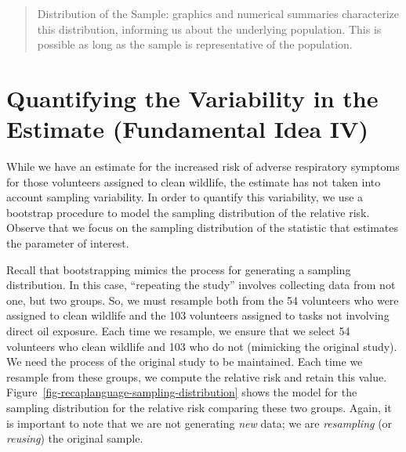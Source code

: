 \documentclass[
  letterpaper,
  DIV=11,
  numbers=noendperiod]{scrreprt}
\theoremstyle{plain}
\theoremstyle{definition}
\theoremstyle{definition}
\theoremstyle{remark}
\begin{document}
\begin{quote}
Distribution of the Sample: graphics and numerical summaries
characterize this distribution, informing us about the underlying
population. This is possible as long as the sample is representative of
the population.
\end{quote}

\hypertarget{quantifying-the-variability-in-the-estimate-fundamental-idea-iv}{%
\section{Quantifying the Variability in the Estimate (Fundamental Idea
IV)}\label{quantifying-the-variability-in-the-estimate-fundamental-idea-iv}}

While we have an estimate for the increased risk of adverse respiratory
symptoms for those volunteers assigned to clean wildlife, the estimate
has not taken into account sampling variability. In order to quantify
this variability, we use a bootstrap procedure to model the sampling
distribution of the relative risk. Observe that we focus on the sampling
distribution of the statistic that estimates the parameter of interest.

Recall that bootstrapping mimics the process for generating a sampling
distribution. In this case, ``repeating the study'' involves collecting
data from not one, but two groups. So, we must resample both from the 54
volunteers who were assigned to clean wildlife and the 103 volunteers
assigned to tasks not involving direct oil exposure. Each time we
resample, we ensure that we select 54 volunteers who clean wildlife and
103 who do not (mimicking the original study). We need the process of
the original study to be maintained. Each time we resample from these
groups, we compute the relative risk and retain this value.
Figure~\ref{fig-recaplanguage-sampling-distribution} shows the model for
the sampling distribution for the relative risk comparing these two
groups. Again, it is important to note that we are not generating
\emph{new} data; we are \emph{resampling} (or \emph{reusing}) the
original sample.
\end{document}
